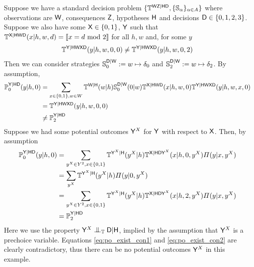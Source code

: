 \begin{example}
Suppose we have a standard decision problem $\{\mathbb{T}^{\mathsf{WZ}|\mathsf{HD}},\{\mathbb{S}_\alpha\}_{\alpha\in A}\}$ where observations are $\mathsf{W}$, consequences $\mathsf{Z}$, hypotheses $\mathsf{H}$ and decisions $\mathsf{D}\in \{0,1,2,3\}$. Suppose we also have some $\mathsf{X}\in \{0,1\}$, $\mathsf{Y}$ such that $\mathbb{T}^{\mathsf{X}|\mathsf{HWD}}(x|h,w,d) = \llbracket x = d\text{ mod }2 \rrbracket$ for all $h,w$ and, for some $y$
\begin{align}
    \mathbb{T}^{\mathsf{Y}|\mathsf{HWXD}}(y|h,w,0,0)\neq \mathbb{T}^{\mathsf{Y}|\mathsf{HWXD}}(y|h,w,0,2) \label{eq:different_ys}
\end{align}
Then we can consider strategies $\mathbb{S}_0^{\mathsf{D}|\mathsf{W}}:=w\mapsto \delta_0$ and $\mathbb{S}_2^{\mathsf{D}|\mathsf{W}}:=w\mapsto \delta_2$. By assumption, 
\begin{align}
    \mathbb{P}_0^{\mathsf{Y}|\mathsf{HD}}(y|h,0) &=  \sum_{x\in \{0,1\},w\in W}\mathbb{T}^{\mathsf{W}|\mathsf{H}}(w|h) \mathbb{S}_0^{\mathsf{D}|\mathsf{W}}(0|w) \mathbb{T}^{\mathsf{X}|\mathsf{HWD}}(x|h,w,0) \mathbb{T}^{\mathsf{Y}|\mathsf{HWXD}}(y|h,w,x,0)\\
    &= \mathbb{T}^{\mathsf{Y}|\mathsf{HWXD}}(y|h,w,0,0)\\
    &\neq \mathbb{P}_2^{\mathsf{Y}|\mathsf{HD}} \label{eq:po_exist_con1}
\end{align}
Suppose we had some potential outcomes $\mathsf{Y}^X$ for $\mathsf{Y}$ with respect to $\mathsf{X}$. Then, by assumption
\begin{align}
    \mathbb{P}_0^{\mathsf{Y}|\mathsf{HD}}(y|h,0) &= \sum_{y^{X}\in Y^2,x\in\{0,1\}} \mathbb{T}^{\mathsf{Y}^X|\mathsf{H}}(y^X|h)\mathbb{T}^{\mathsf{X}|\mathsf{HDY}^X}(x|h,0,y^X)\Pi(y|x,y^X)\\
                                        &= \sum_{y^X} \mathbb{T}^{\mathsf{Y}^X|\mathsf{H}}(y^X|h)\Pi(y|0,y^X)\\
                                        &= \sum_{y^{X}\in Y^2,x\in\{0,1\}} \mathbb{T}^{\mathsf{Y}^X|\mathsf{H}}(y^X|h)\mathbb{T}^{\mathsf{X}|\mathsf{HDY}^X}(x|h,2,y^X)\Pi(y|x,y^X)\\
                                        &= \mathbb{P}_2^{\mathsf{Y}|\mathsf{HD}} \label{eq:po_exist_con2}
\end{align}
Here we use the property $\RV{Y}^X\CI_{\model{T}}\RV{D}|\RV{H}$, implied by the assumption that $\mathsf{Y}^X$ is a prechoice variable. Equations \ref{eq:po_exist_con1} and \ref{eq:po_exist_con2} are clearly contradictory, thus there can be no potential outcomes $\mathsf{Y}^X$ in this example.
\end{example}


